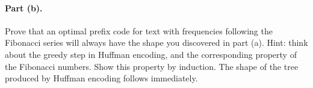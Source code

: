 \documentclass{article}
\begin{document}
\paragraph{Part (b).}

Prove that an optimal prefix code for text with frequencies following the Fibonacci series will always have the shape you discovered in part (a).  Hint: think about the greedy step in Huffman encoding, and the corresponding property of the Fibonacci numbers.  Show this property by induction.  The shape of the tree produced by Huffman encoding follows immediately.
\end{document}
